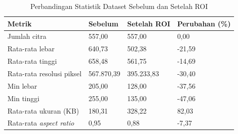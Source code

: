 \begin{table}[H]
	\centering
	\caption{Perbandingan Statistik Dataset Sebelum dan Setelah ROI}
	\label{tab:statistik_roi}
	\begin{tabular}{|l|l|l|l|}
		\hline
		\textbf{Metrik} & \textbf{Sebelum} & \textbf{Setelah ROI} & \textbf{Perubahan (\%)} \\ \hline
		Jumlah citra & 557,00 & 557,00 & 0,00 \\ \hline
		Rata-rata lebar & 640,73 & 502,38 & -21,59 \\ \hline
		Rata-rata tinggi & 658,48 & 561,75 & -14,69 \\ \hline
		Rata-rata resolusi piksel & 567.870,39 & 395.233,83 & -30,40 \\ \hline
		Min lebar & 205,00 & 128,00 & -37,56 \\ \hline
		Min tinggi & 255,00 & 135,00 & -47,06 \\ \hline
		Rata-rata ukuran (KB) & 180,31 & 328,22 & 82,03 \\ \hline
		Rata-rata \textit{aspect ratio} & 0,95 & 0,88 & -7,37 \\ \hline
	\end{tabular}
\end{table}